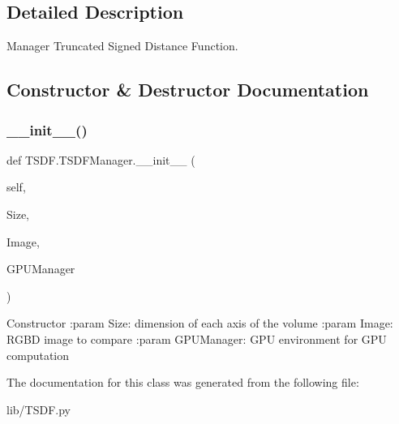 \subsection{Detailed Description}
\begin{DoxyVerb}Manager Truncated Signed Distance Function.
\end{DoxyVerb}
 

\subsection{Constructor \& Destructor Documentation}
\mbox{\label{class_t_s_d_f_1_1_t_s_d_f_manager_aa12aee58f9d79032e2ff5256a1eaba35}} 
\subsubsection{\+\_\+\+\_\+init\+\_\+\+\_\+()}
{\footnotesize\ttfamily def T\+S\+D\+F.\+T\+S\+D\+F\+Manager.\+\_\+\+\_\+init\+\_\+\+\_\+ (\begin{DoxyParamCaption}\item[{}]{self,  }\item[{}]{Size,  }\item[{}]{Image,  }\item[{}]{G\+P\+U\+Manager }\end{DoxyParamCaption})}

\begin{DoxyVerb}Constructor
:param Size: dimension of each axis of the volume
:param Image: RGBD image to compare
:param GPUManager: GPU environment for GPU computation
\end{DoxyVerb}
 

The documentation for this class was generated from the following file\+:\begin{DoxyCompactItemize}
\item 
lib/T\+S\+D\+F.\+py\end{DoxyCompactItemize}
